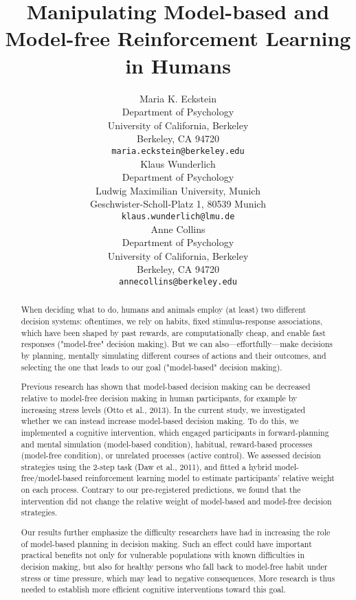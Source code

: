 \documentclass[11pt]{article} %
\title{Manipulating Model-based and Model-free Reinforcement Learning in Humans}
\author{
Maria K. Eckstein \\
Department of Psychology \\
University of California, Berkeley \\
Berkeley, CA 94720 \\
\texttt{maria.eckstein@berkeley.edu} \\
\And
Klaus Wunderlich \\
Department of Psychology \\
Ludwig Maximilian University, Munich \\
Geschwister-Scholl-Platz 1, 80539 Munich \\
\texttt{klaus.wunderlich@lmu.de} \\
\And
Anne Collins \\
Department of Psychology\\
University of California, Berkeley \\
Berkeley, CA 94720  \\
\texttt{annecollins@berkeley.edu} \\
}
\begin{document}
\maketitle

\begin{abstract}

When deciding what to do, humans and animals employ (at least) two different decision systems: oftentimes, we rely on habits, fixed stimulus-response associations, which have been shaped by past rewards, are computationally cheap, and enable fast responses ("model-free" decision making). But we can also---effortfully---make decisions by planning, mentally simulating different courses of actions and their outcomes, and selecting the one that leads to our goal ("model-based" decision making). 

Previous research has shown that model-based decision making can be decreased relative to model-free decision making in human participants, for example by increasing stress levels (Otto et al., 2013). In the current study, we investigated whether we can instead increase model-based decision making. To do this, we implemented a cognitive intervention, which engaged participants in forward-planning and mental simulation (model-based condition), habitual, reward-based processes (model-free condition), or unrelated processes (active control). We assessed decision strategies using the 2-step task (Daw et al., 2011), and fitted a hybrid model-free/model-based reinforcement learning model to estimate participants' relative weight on each process. Contrary to our pre-registered predictions, we found that the intervention did not change the relative weight of model-based and model-free decision strategies. 

Our results further emphasize the difficulty researchers have had in increasing the role of model-based planning in decision making. Such an effect could have important practical benefits not only for vulnerable populations with known difficulties in decision making, but also for healthy persons who fall back to model-free habit under stress or time pressure, which may lead to negative consequences. More research is thus needed to establish more efficient cognitive interventions toward this goal.

\end{abstract}
\end{document}
